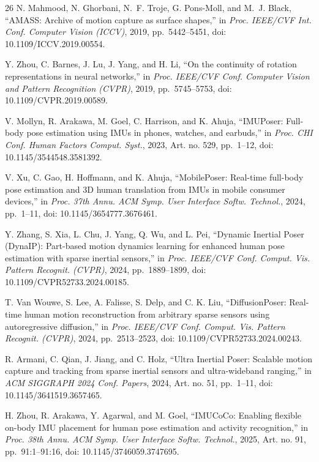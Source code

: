\documentclass[conference]{IEEEtran}
\begin{document}
\begin{thebibliography}{26}
N. Mahmood, N. Ghorbani, N.~F. Troje, G. Pons-Moll, and M.~J. Black,
``AMASS: Archive of motion capture as surface shapes,''
in \textit{Proc. IEEE/CVF Int. Conf. Computer Vision (ICCV)}, 2019, pp.~5442--5451,
doi: 10.1109/ICCV.2019.00554.

Y. Zhou, C. Barnes, J. Lu, J. Yang, and H. Li,
``On the continuity of rotation representations in neural networks,''
in \textit{Proc. IEEE/CVF Conf. Computer Vision and Pattern Recognition (CVPR)}, 2019,
pp.~5745--5753, doi: 10.1109/CVPR.2019.00589.

{\color{blue}
V. Mollyn, R. Arakawa, M. Goel, C. Harrison, and K. Ahuja,
``IMUPoser: Full-body pose estimation using IMUs in phones, watches, and earbuds,''
in \textit{Proc. CHI Conf. Human Factors Comput. Syst.}, 2023,
Art. no. 529, pp.~1--12,
doi: 10.1145/3544548.3581392.

V. Xu, C. Gao, H. Hoffmann, and K. Ahuja,
``MobilePoser: Real-time full-body pose estimation and 3D human translation from IMUs in
mobile consumer devices,''
in \textit{Proc. 37th Annu. ACM Symp. User Interface Softw. Technol.},
2024, pp.~1--11,
doi: 10.1145/3654777.3676461.

Y. Zhang, S. Xia, L. Chu, J. Yang, Q. Wu, and L. Pei,
``Dynamic Inertial Poser (DynaIP): Part-based motion dynamics learning for enhanced human
pose estimation with sparse inertial sensors,''
in \textit{Proc. IEEE/CVF Conf. Comput. Vis. Pattern Recognit. (CVPR)},
2024, pp.~1889--1899,
doi: 10.1109/CVPR52733.2024.00185.

T. Van Wouwe, S. Lee, A. Falisse, S. Delp, and C. K. Liu,
``DiffusionPoser: Real-time human motion reconstruction from arbitrary sparse sensors using
autoregressive diffusion,''
in \textit{Proc. IEEE/CVF Conf. Comput. Vis. Pattern Recognit. (CVPR)},
2024, pp.~2513--2523,
doi: 10.1109/CVPR52733.2024.00243.

R. Armani, C. Qian, J. Jiang, and C. Holz,
``Ultra Inertial Poser: Scalable motion capture and tracking from sparse inertial sensors
and ultra-wideband ranging,''
in \textit{ACM SIGGRAPH 2024 Conf. Papers}, 2024,
Art. no. 51, pp.~1--11,
doi: 10.1145/3641519.3657465.

H. Zhou, R. Arakawa, Y. Agarwal, and M. Goel,
``IMUCoCo: Enabling flexible on-body IMU placement for human pose estimation and activity
recognition,''
in \textit{Proc. 38th Annu. ACM Symp. User Interface Softw. Technol.},
2025, Art. no. 91, pp.~91:1--91:16,
doi: 10.1145/3746059.3747695.

}
\end{thebibliography}
\end{document}

